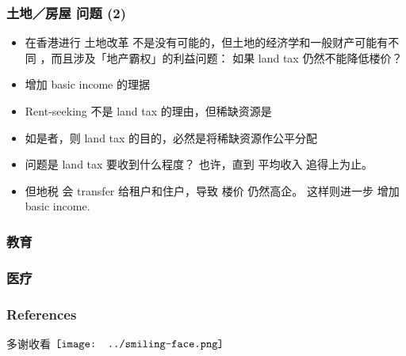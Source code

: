 \documentclass[16pt]{beamer}
\newcommand{\emp}[1]{{\color{blue}#1}}
\renewcommand{\smiley}{$\vcenter{\hbox{\texttt{[image: ../smiling-face.png]}}}$}
\newif\ifframeinlbf
\begin{document}
\frameinlbffalse
\begin{frame}
\frametitle{土地／房屋 问题 (2)}
\begin{itemize}
	\item 在香港进行 \emp{土地改革} 不是没有可能的，但土地的经济学和一般财产可能有不同 \cite{Ryan-Collins2017} \cite{Farvacque-Vitkoviac1992} \cite{Blomley2004} \cite{Linklater2013} \cite{Adams2015}，而且涉及「地产霸权」的利益问题： 如果 land tax 仍然不能降低楼价？ 

	\item 增加 basic income 的理据

	\item Rent-seeking 不是 land tax 的理由，但稀缺资源是

	\item 如是者，则 land tax 的目的，必然是将稀缺资源作公平分配

	\item 问题是 land tax 要收到什么程度？  也许，直到 平均收入 追得上为止。

	\item 但地税 会 transfer 给租户和住户，导致 楼价 仍然高企。  这样则进一步 增加 basic income.
\end{itemize}
\end{frame}

\frameinlbftrue
\begin{frame}
\frametitle{教育}
\end{frame}

\begin{frame}
\frametitle{医疗}
\end{frame}

\begin{frame}
\frametitle{References}
\printbibliography
\begin{center}
	多谢收看 \smiley
\end{center}
\end{frame}
\end{document}
